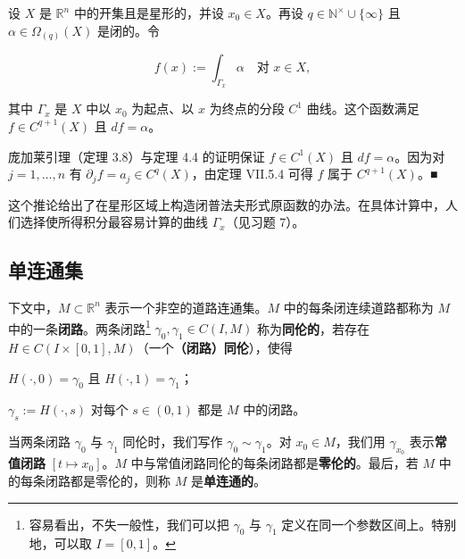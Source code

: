 \begin{corollary}

设 $ X $ 是 $ \mathbb{R}^{n} $ 中的开集且是星形的，并设 $ x_0 \in X $。再设 $ q \in \mathbb{N}^{\times}\cup\{\infty\} $ 且 $ \alpha \in \Omega_{(q)}(X) $ 是闭的。令

\[
f(x):=\int_{\Gamma_x}\alpha\quad\text{对 }x\in X ,
\]

其中 $ \Gamma_x $ 是 $ X $ 中以 $ x_0 $ 为起点、以 $ x $ 为终点的分段 $ C^1 $ 曲线。这个函数满足 $ f \in C^{q+1}(X) $ 且 $ df=\alpha $。

\proofhead
庞加莱引理（定理 3.8）与定理 4.4 的证明保证 $ f \in C^1(X) $ 且 $ df=\alpha $。因为对 $ j=1,\ldots,n $ 有 $ \partial_j f=a_j \in C^{q}(X) $，由定理 VII.5.4 可得 $ f $ 属于 $ C^{q+1}(X) $。\nobreak\hspace{0.35em}■
\end{corollary}

这个推论给出了在星形区域上构造闭普法夫形式原函数的办法。在具体计算中，人们选择使所得积分最容易计算的曲线 $ \Gamma_x $（见习题 7）。

\subsection*{单连通集}

下文中，$ M \subset \mathbb{R}^{n} $ 表示一个非空的道路连通集。$ M $ 中的每条闭连续道路都称为 $ M $ 中的一条\textbf{闭路}。两条闭路\footnote{容易看出，不失一般性，我们可以把 $ \gamma_{0} $ 与 $ \gamma_{1} $ 定义在同一个参数区间上。特别地，可以取 $ I = [0,1] $。} $ \gamma_{0},\gamma_{1} \in C(I,M) $ 称为\textbf{同伦的}，若存在 $ H \in C(I\times[0,1],M) $（一个\textbf{（闭路）同伦}），使得

\begin{subitems}
\item

$ H(\cdot,0) = \gamma_{0} $ 且 $ H(\cdot,1) = \gamma_{1} $；

\item

$ \gamma_{s} := H(\cdot,s) $ 对每个 $ s \in (0,1) $ 都是 $ M $ 中的闭路。

\end{subitems}


当两条闭路 $ \gamma_{0} $ 与 $ \gamma_{1} $ 同伦时，我们写作 $ \gamma_{0} \sim \gamma_{1} $。对 $ x_{0} \in M $，我们用 $ \gamma_{x_{0}} $ 表示\textbf{常值闭路} $ [t \mapsto x_{0}] $。$ M $ 中与常值闭路同伦的每条闭路都是\textbf{零伦的}。最后，若 $ M $ 中的每条闭路都是零伦的，则称 $ M $ 是\textbf{单连通的}。

